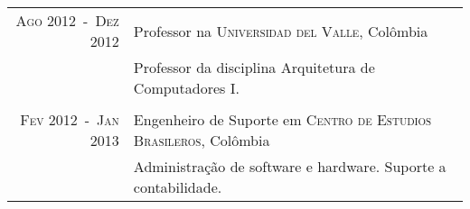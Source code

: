 \documentclass[a4paper,10pt]{article}
\begin{document}
\begin{longtable}{rl}
    \textsc{Ago 2012~-~Dez 2012}    & Professor na \textsc{Universidad del Valle}, Colômbia \\
                                    &\footnotesize{Professor da disciplina Arquitetura de Computadores I.} \\
                                    &\\

    \textsc{Fev 2012~-~Jan 2013}    & Engenheiro de Suporte em \textsc{Centro de Estudios Brasileros}, Colômbia \\
                                    &\footnotesize{Administração de software e hardware. Suporte a contabilidade.} \\
\end{longtable}

\end{document}
